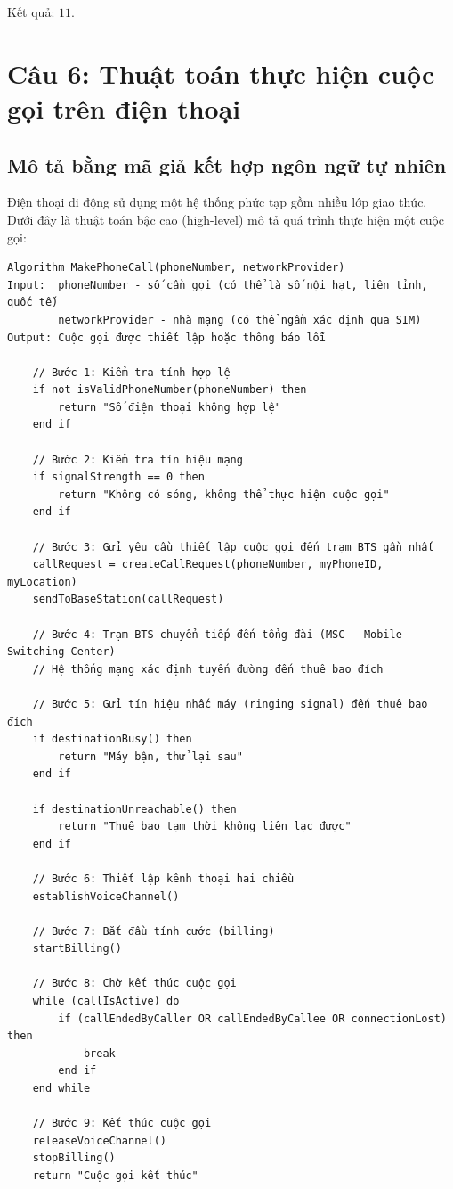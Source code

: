 \documentclass[12pt,a4paper]{article}
\begin{document}
Kết quả: $11$.

\section*{Câu 6: Thuật toán thực hiện cuộc gọi trên điện thoại}

\subsection*{Mô tả bằng mã giả kết hợp ngôn ngữ tự nhiên}

Điện thoại di động sử dụng một hệ thống phức tạp gồm nhiều lớp giao thức. Dưới đây là thuật toán bậc cao (high-level) mô tả quá trình thực hiện một cuộc gọi:

\begin{verbatim}
Algorithm MakePhoneCall(phoneNumber, networkProvider)
Input:  phoneNumber - số cần gọi (có thể là số nội hạt, liên tỉnh, quốc tế)
        networkProvider - nhà mạng (có thể ngầm xác định qua SIM)
Output: Cuộc gọi được thiết lập hoặc thông báo lỗi

    // Bước 1: Kiểm tra tính hợp lệ
    if not isValidPhoneNumber(phoneNumber) then
        return "Số điện thoại không hợp lệ"
    end if
    
    // Bước 2: Kiểm tra tín hiệu mạng
    if signalStrength == 0 then
        return "Không có sóng, không thể thực hiện cuộc gọi"
    end if
    
    // Bước 3: Gửi yêu cầu thiết lập cuộc gọi đến trạm BTS gần nhất
    callRequest = createCallRequest(phoneNumber, myPhoneID, myLocation)
    sendToBaseStation(callRequest)
    
    // Bước 4: Trạm BTS chuyển tiếp đến tổng đài (MSC - Mobile Switching Center)
    // Hệ thống mạng xác định tuyến đường đến thuê bao đích
    
    // Bước 5: Gửi tín hiệu nhấc máy (ringing signal) đến thuê bao đích
    if destinationBusy() then
        return "Máy bận, thử lại sau"
    end if
    
    if destinationUnreachable() then
        return "Thuê bao tạm thời không liên lạc được"
    end if
    
    // Bước 6: Thiết lập kênh thoại hai chiều
    establishVoiceChannel()
    
    // Bước 7: Bắt đầu tính cước (billing)
    startBilling()
    
    // Bước 8: Chờ kết thúc cuộc gọi
    while (callIsActive) do
        if (callEndedByCaller OR callEndedByCallee OR connectionLost) then
            break
        end if
    end while
    
    // Bước 9: Kết thúc cuộc gọi
    releaseVoiceChannel()
    stopBilling()
    return "Cuộc gọi kết thúc"
\end{verbatim}
\end{document}
